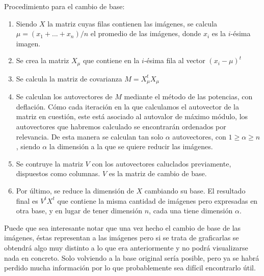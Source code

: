 \bigskip

Procedimiento para el cambio de base:

\begin{enumerate}
\item Siendo $X$ la matriz cuyas filas contienen las imágenes, se calcula $\mu = (x_1 + ... + x_n)/n$ el promedio de las imágenes, donde $x_i$ es la $i$-ésima imagen.
\item Se crea la matriz $X_\mu$ que contiene en la $i$-ésima fila al vector $(x_i - \mu)^t$
\item Se calcula la matriz de covarianza $M = X_\mu^tX_\mu$
\item Se calculan los autovectores de $M$ mediante el método de las potencias, con deflación. Cómo cada iteración en la que calculamos el autovector de la matriz en cuestión, este está asociado al autovalor de máximo módulo, los autovectores que habremos calculado se encontrarán ordenados por relevancia. De esta manera se calculan tan solo $\alpha$ autovectores, con $1 \geq \alpha \geq n$, siendo $\alpha$ la dimensión a la que se quiere reducir las imágenes.
\item Se contruye la matriz $V$ con los autovectores caluclados previamente, dispuestos como columnas. $V$ es la matriz de cambio de base.
\item Por último, se reduce la dimensión de $X$ cambiando su base. El resultado final es $V^tX^t$ que contiene la misma cantidad de imágenes pero expresadas en otra base, y en lugar de tener dimensión $n$, cada una tiene dimensión $\alpha$.
\end{enumerate}\tabularnewline

Puede que sea interesante notar que una vez hecho el cambio de base de las imágenes, éstas representan a las imágenes pero si se trata de graficarlas se obtendrá algo muy distinto a lo que era anteriormente y no podrá visualizarse nada en concreto. Solo volviendo a la base original sería posible, pero ya se habrá perdido mucha información por lo que probablemente sea difícil encontrarlo útil.
